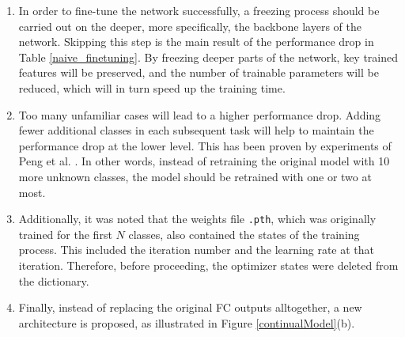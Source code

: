 \documentclass[english, 12pt, a4paper, elec, utf8, a-1b, online]{aaltothesis}
\begin{document}
\begin{enumerate}
\item In order to fine-tune the network successfully, a freezing process should be carried out on the deeper, more specifically, the backbone layers of the network. Skipping this step is the main result of the performance drop in Table \ref{naive_finetuning}. By freezing deeper parts of the network, key trained features will be preserved, and the number of trainable parameters will be reduced, which will in turn speed up the training time.
\item Too many unfamiliar cases will lead to a higher performance drop. Adding fewer additional classes in each subsequent task will help to maintain the performance drop at the lower level. This has been proven by experiments of Peng et al. \cite{Peng2020}. In other words, instead of retraining the original model with 10 more unknown classes, the model should be retrained with one or two at most. 
\item Additionally, it was noted that the weights file \texttt{.pth}, which was originally trained for the first $N$ classes, also contained the states of the training process. This included the iteration number and the learning rate at that iteration. Therefore, before proceeding, the optimizer states were deleted from the dictionary. 
\item Finally, instead of replacing the original FC outputs alltogether, a new architecture is proposed, as illustrated in Figure \ref{continualModel}(b). 
\end{enumerate}
\end{document}
